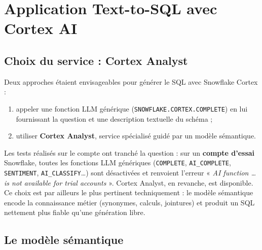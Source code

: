 \chapter{Application Text-to-SQL avec Cortex AI}
\label{ch:application}

\section{Choix du service : Cortex Analyst}

Deux approches étaient envisageables pour générer le SQL avec Snowflake Cortex :
\begin{enumerate}
  \item appeler une fonction LLM générique (\texttt{SNOWFLAKE.CORTEX.COMPLETE}) en lui fournissant la
        question et une description textuelle du schéma ;
  \item utiliser \textbf{Cortex Analyst}, service spécialisé guidé par un modèle sémantique.
\end{enumerate}

Les tests réalisés sur le compte ont tranché la question : sur un \textbf{compte d'essai} Snowflake,
toutes les fonctions LLM génériques (\texttt{COMPLETE}, \texttt{AI\_COMPLETE}, \texttt{SENTIMENT},
\texttt{AI\_CLASSIFY}\ldots) sont désactivées et renvoient l'erreur
« \emph{AI function \ldots{} is not available for trial accounts} ». Cortex Analyst, en revanche, est
disponible. Ce choix est par ailleurs le plus pertinent techniquement : le modèle sémantique encode la
connaissance métier (synonymes, calculs, jointures) et produit un SQL nettement plus fiable qu'une
génération libre.

\section{Le modèle sémantique}

